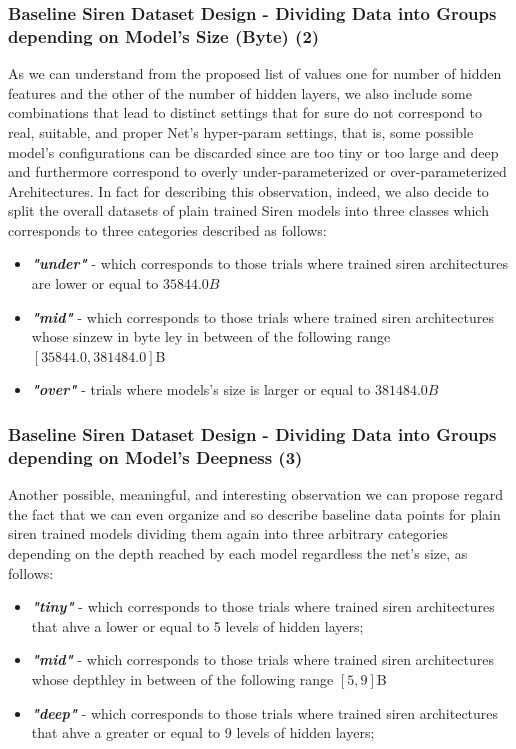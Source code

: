 \begin{frame}
\frametitle{Baseline Siren Dataset Design - Dividing Data into Groups depending on Model's Size (Byte) (2)}
As we can understand from the proposed list of values one for number of hidden features and the other of the number of hidden layers, we also include some combinations that lead to
distinct settings that for sure do not correspond to real, suitable, and proper Net's hyper-param settings, that is, some possible model's configurations can be discarded since are
too tiny or too large and deep and furthermore correspond to overly under-parameterized or over-parameterized Architectures. In fact for describing this observation, indeed, we also
decide to split the overall datasets of plain trained Siren models into three classes which corresponds to three categories described as follows:

\begin{itemize}
\item \textbf{\textit{"under"}} - which corresponds to those trials where trained siren architectures are lower or equal to $35844.0B$
\item \textbf{\textit{"mid"}} - which corresponds to those trials where trained siren architectures whose sinzew in byte ley in between of the following range $[35844.0,381484.0]$B
\item \textbf{\textit{"over"}} - trials where models's size is larger or equal to $381484.0B$

\end{itemize}

\end{frame}

\begin{frame}
\frametitle{Baseline Siren Dataset Design - Dividing Data into Groups depending on Model's Deepness  (3)}
Another possible, meaningful, and interesting observation we can propose regard the fact that we can even organize and so describe baseline data points for plain siren trained models
dividing them again into three arbitrary categories depending on the depth reached by each model regardless the net's size, as follows:

\begin{itemize}
\item \textbf{\textit{"tiny"}} - which corresponds to those trials where trained siren architectures that ahve a  lower or equal to 5 levels of hidden layers;
\item \textbf{\textit{"mid"}} - which corresponds to those trials where trained siren architectures whose depthley in between of the following range $[5,9]$B
\item \textbf{\textit{"deep"}} - which corresponds to those trials where trained siren architectures that ahve a  greater or equal to 9 levels of hidden layers;

\end{itemize}

\end{frame}


